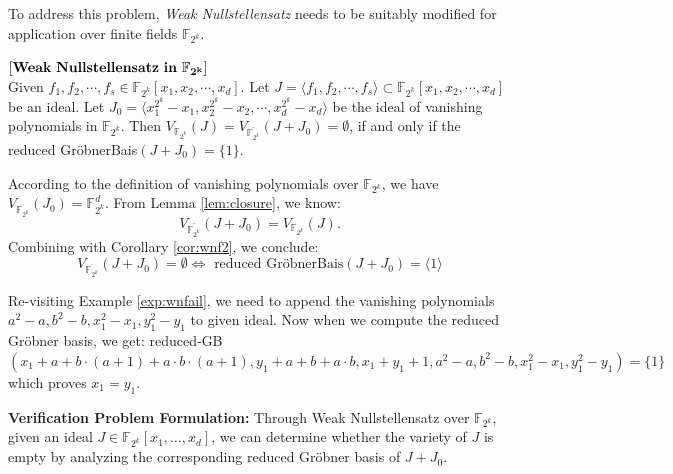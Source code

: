 To address this problem, {\it Weak Nullstellensatz} needs to be suitably
modified for application over finite fields $\mathbb{F}_{2^{k}}$. 
\begin{Theorem}\label{wnull:ff}
$[\bf{Weak~Nullstellensatz~in~\mathbb{F}_{2^k}}]$\\
Given $f_1,f_2,\cdots,f_s \in \mathbb{F}_{2^k}[x_1,x_2,\cdots,x_d]$. 
Let $J=\langle f_1,f_2,\cdots,f_s\rangle \subset \mathbb{F}_{2^k}[x_1,
x_2, \cdots, x_d]$ be an ideal. Let $J_0 = \langle 
x_1^{2^k}-x_1,x_2^{2^k}-x_2,\cdots,x_d^{2^k}-x_d \rangle$ be the ideal
of vanishing polynomials in $\mathbb{F}_{2^k}$. Then
$V_{\mathbb{F}_{2^k}}(J) = V_{\overline {\mathbb{F}_{2^k}}}(J +
J_0)=\emptyset$,  if and only if the reduced
Gr\"obnerBais$(J+J_{0})=\{1\}$. 
\end{Theorem}
 
\begin{Proof}
According to the definition of vanishing polynomials over
$\mathbb{F}_{2^k}$, we have $V_{\overline
  {\mathbb{F}_{2^k}}}(J_0)={\mathbb{F}_{2^k}^d}$. 
From Lemma \ref{lem:closure}, we know:
\begin{equation}
	V_{\overline {\mathbb{F}_{2^k}}}(J+J_0)=V_{\mathbb{F}_{2^k}}(J). 
\end{equation}
Combining with Corollary \ref{cor:wnf2}, we conclude:
\begin{equation}
V_{\overline {\mathbb{F}_{2^k}}}(J+J_0)=\emptyset \Leftrightarrow
\text{ reduced Gr\"obnerBais}(J+J_0) =\langle 1\rangle 
\end{equation}
\end{Proof}

\begin{Example}
Re-visiting Example \ref{exp:wnfail}, we need to append the vanishing
polynomials $a^2-a,b^2-b,x_1^2-x_1,y_1^2-y_1$ to given ideal.  Now
when we compute the reduced Gr\"obner basis, we get: reduced-GB$(x_1+
a + b\cdot(a+1) + a\cdot b\cdot(a+1),y_1+a+b+a\cdot
b,x_1+y_1+1,a^2-a,b^2-b,x_1^2-x_1,y_1^2-y_1)=\{1\}$ which proves
$x_1=y_1$. 
\end{Example}


{\bf Verification Problem Formulation:}
Through Weak Nullstellensatz over $\mathbb{F}_{{2^k}}$, given an ideal
$J \in \mathbb{F}_{2^k}[x_{1},\dots,x_{d}]$,  we can determine whether
the variety of $J$ is empty by analyzing the corresponding reduced
Gr\"obner basis of $J+J_0$. 

